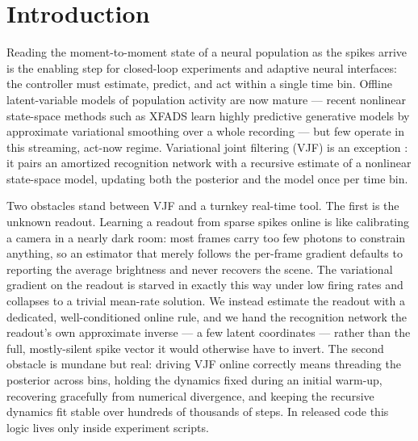 \documentclass[11pt]{article}
\begin{document}
\section{Introduction}
Reading the moment-to-moment state of a neural population as the spikes arrive is the enabling
step for closed-loop experiments and adaptive neural interfaces: the controller must estimate,
predict, and act within a single time bin. Offline latent-variable models of population activity
are now mature --- recent nonlinear state-space methods such as XFADS \autocite{Dowling2024b}
learn highly predictive generative models by approximate variational smoothing over a whole
recording --- but few operate in this streaming, act-now regime. Variational joint filtering
(VJF) is an exception \autocite{zhao2020variational}: it pairs an amortized recognition network
\autocite{kingma2014auto} with a recursive estimate of a nonlinear state-space model, updating
both the posterior and the model once per time bin.

Two obstacles stand between VJF and a turnkey real-time tool. The first is the unknown readout.
Learning a readout from sparse spikes online is like calibrating a camera in a nearly dark room:
most frames carry too few photons to constrain anything, so an estimator that merely follows the
per-frame gradient defaults to reporting the average brightness and never recovers the scene. The
variational gradient on the readout is starved in exactly this way under low firing rates and
collapses to a trivial mean-rate solution. We instead estimate the readout with a dedicated,
well-conditioned online rule, and we hand the recognition network the readout's own approximate
inverse --- a few latent coordinates --- rather than the full, mostly-silent spike vector it
would otherwise have to invert. The second obstacle is mundane but real: driving VJF online
correctly means threading the posterior across bins, holding the dynamics fixed during an initial
warm-up, recovering gracefully from numerical divergence, and keeping the recursive dynamics fit
stable over hundreds of thousands of steps. In released code this logic lives only inside
experiment scripts.
\end{document}
